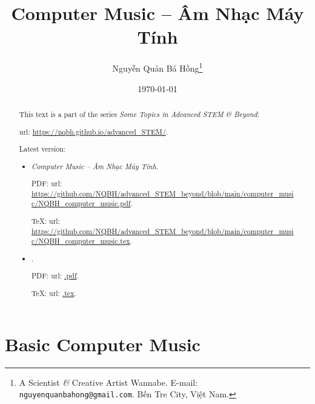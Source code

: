 \documentclass{article}
\title{Computer Music -- Âm Nhạc Máy Tính}
\author{Nguyễn Quản Bá Hồng\footnote{A Scientist {\it\&} Creative Artist Wannabe. E-mail: {\tt nguyenquanbahong@gmail.com}. Bến Tre City, Việt Nam.}}
\date{\today}
\begin{document}
\maketitle
\begin{abstract}
	This text is a part of the series {\it Some Topics in Advanced STEM \& Beyond}:
	
	{\sc url}: \url{https://nqbh.github.io/advanced_STEM/}.
	
	Latest version:
	\begin{itemize}
		\item {\it Computer Music -- Âm Nhạc Máy Tính}.
		
		PDF: {\sc url}: \url{https://github.com/NQBH/advanced_STEM_beyond/blob/main/computer_music/NQBH_computer_music.pdf}.
		
		\TeX: {\sc url}: \url{https://github.com/NQBH/advanced_STEM_beyond/blob/main/computer_music/NQBH_computer_music.tex}.
		\item {\it }.
		
		PDF: {\sc url}: \url{.pdf}.
		
		\TeX: {\sc url}: \url{.tex}.
	\end{itemize}
\end{abstract}
\tableofcontents


\section{Basic Computer Music}
\end{document}
